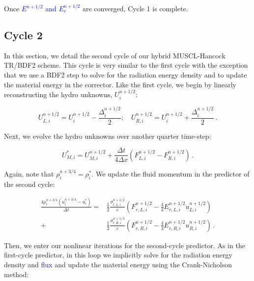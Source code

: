 \documentclass[preprint,12pt]{elsarticle}
\newcommand{\URL}[1]{{\textcolor{blue}{#1}}}
\newcommand{\fn}[1]{\left( #1 \right)}
\newcommand{\be}{\begin{equation}}
\newcommand{\ee}{\end{equation}}
\newcommand{\pep}{\, .}
\newcommand{\lequ}[1]{\label{eq:#1}}
\newcommand{\half}{\frac{1}{2}}
\begin{document}
Once \URL{$E^{n+1/2}$ and $E_{r}^{n+1/2}$} are converged, Cycle 1 is complete.

\subsection{Cycle 2}
In this section, we detail the second cycle of our hybrid MUSCL-Hancock TR/BDF2 scheme.  This cycle is very similar to the first cycle with the exception that we use a BDF2 step to solve for the radiation energy density and to update the material energy in the corrector.  Like the first cycle, we begin by linearly reconstructing the hydro unknowns, $U_i^{n+1/2}$: 

\be
U_{L,i}^{n+1/2} = U_i^{n+1/2} - \frac{\Delta^{n+1/2}_i}{2};\quad U_{R,i}^{n+1/2} = U_i^{n+1/2} + \frac{\Delta^{n+1/2}_i}{2} \pep
\lequ{reconstructed2}
\ee

Next, we evolve the hydro unknowns over another quarter time-step:

\be
U_{M,i}^{*} = U_{M,i}^{n+1/2} + \frac{\Delta t}{4\Delta x}\fn{F_{L,i}^{n+1/2}-F_{R,i}^{n+1/2}} \pep
\lequ{evolved_quart2}
\ee

Again, note that $\rho_{i}^{n+3/4} = \rho_{i}^{*}$.  We update the fluid momentum in the predictor of the second cycle: 

\begin{align}
\nonumber\frac{4\rho^{n+3/4}_{i}\fn{u^{n+3/4}_{i}-u^{*}_{i}}}{\Delta t} = &\half\frac{\sigma_{t,L,i}^{n+1/2}}{c}\fn{F_{r,L,i}^{n+1/2}-\frac{4}{3}E_{r,L,i}^{n+1/2}u_{L,i}^{n+1/2}} \\
+&\half\frac{\sigma_{t,R,i}^{n+1/2}}{c}\fn{F_{r,R,i}^{n+1/2}-\frac{4}{3}E_{r,R,i}^{n+1/2}u_{R,i}^{n+1/2}} \pep
\lequ{mom_quart_up2}
\end{align}

Then, we enter our nonlinear iterations for the second-cycle predictor.  As in the first-cycle predictor, in this loop we implicitly solve for the radiation energy density and \URL{flux} and update the material energy using the Crank-Nicholson method:
\end{document}
